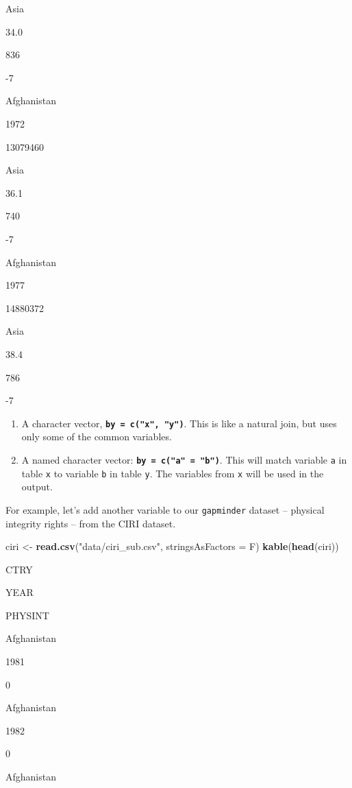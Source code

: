 \documentclass[]{book}
\newenvironment{Shaded}{\begin{snugshade}}{\end{snugshade}}
\newcommand{\DataTypeTok}[1]{\textcolor[rgb]{0.13,0.29,0.53}{#1}}
\newcommand{\KeywordTok}[1]{\textcolor[rgb]{0.13,0.29,0.53}{\textbf{#1}}}
\newcommand{\NormalTok}[1]{#1}
\newcommand{\StringTok}[1]{\textcolor[rgb]{0.31,0.60,0.02}{#1}}
\begin{document}
Asia

34.0

836

-7

Afghanistan

1972

13079460

Asia

36.1

740

-7

Afghanistan

1977

14880372

Asia

38.4

786

-7

\begin{enumerate}
\def\labelenumi{\arabic{enumi}.}
\setcounter{enumi}{1}
\item
  A character vector, \textbf{\texttt{by\ =\ c("x",\ "y")}}. This is like a natural join, but uses only some of the common variables.
\item
  A named character vector: \textbf{\texttt{by\ =\ c("a"\ =\ "b")}}. This will match variable \texttt{a} in table \texttt{x} to variable \texttt{b} in table \texttt{y}. The variables from \texttt{x} will be used in the output.
\end{enumerate}

For example, let's add another variable to our \texttt{gapminder} dataset -- physical integrity rights -- from the CIRI dataset.

\begin{Shaded}
\begin{Highlighting}[]
\NormalTok{ciri <-}\StringTok{ }\KeywordTok{read.csv}\NormalTok{(}\StringTok{"data/ciri_sub.csv"}\NormalTok{, }\DataTypeTok{stringsAsFactors =}\NormalTok{ F)}
\KeywordTok{kable}\NormalTok{(}\KeywordTok{head}\NormalTok{(ciri))}
\end{Highlighting}
\end{Shaded}

CTRY

YEAR

PHYSINT

Afghanistan

1981

0

Afghanistan

1982

0

Afghanistan
\end{document}
